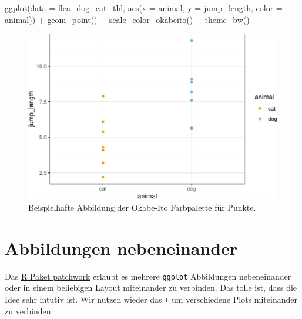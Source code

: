 \documentclass[
  letterpaper,
]{scrbook}
\newenvironment{Shaded}{\begin{snugshade}}{\end{snugshade}}
\newcommand{\AttributeTok}[1]{\textcolor[rgb]{0.40,0.45,0.13}{#1}}
\newcommand{\FunctionTok}[1]{\textcolor[rgb]{0.28,0.35,0.67}{#1}}
\newcommand{\NormalTok}[1]{\textcolor[rgb]{0.00,0.23,0.31}{#1}}
\newcommand{\SpecialCharTok}[1]{\textcolor[rgb]{0.37,0.37,0.37}{#1}}
\begin{document}
\begin{Shaded}
\begin{Highlighting}[]
\FunctionTok{ggplot}\NormalTok{(}\AttributeTok{data =}\NormalTok{ flea\_dog\_cat\_tbl, }
       \FunctionTok{aes}\NormalTok{(}\AttributeTok{x =}\NormalTok{ animal, }\AttributeTok{y =}\NormalTok{ jump\_length,}
           \AttributeTok{color =}\NormalTok{ animal)) }\SpecialCharTok{+}
  \FunctionTok{geom\_point}\NormalTok{() }\SpecialCharTok{+}
  \FunctionTok{scale\_color\_okabeito}\NormalTok{() }\SpecialCharTok{+}
  \FunctionTok{theme\_bw}\NormalTok{()}
\end{Highlighting}
\end{Shaded}

\begin{figure}[H]

{\centering \includegraphics{./eda-ggplot_files/figure-pdf/fig-labels-see-1-1.pdf}

}

\caption{\label{fig-labels-see-1}Beispielhafte Abbildung der Okabe-Ito
Farbpalette für Punkte.}

\end{figure}

\hypertarget{abbildungen-nebeneinander}{%
\section{Abbildungen nebeneinander}\label{abbildungen-nebeneinander}}

Das
\href{https://patchwork.data-imaginist.com/articles/patchwork.html}{R
Paket patchwork} erlaubt es mehrere \texttt{ggplot} Abbildungen
nebeneinander oder in einem beliebigen Layout miteinander zu verbinden.
Das tolle ist, dass die Idee sehr intutiv ist. Wir nutzen wieder das
\texttt{+} um verschiedene Plots miteinander zu verbinden.
\end{document}
